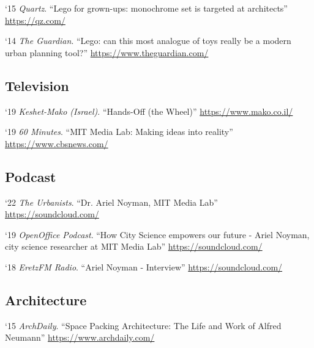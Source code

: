 \begin{tablist}
    \item[`15] \tab \textit{Quartz}. \enquote{Lego for grown-ups: monochrome set is targeted at architects}
    \href{https://qz.com/315776/lego-for-grown-ups-the-toy-maker-is-targeting-architects-and-urban-planners/}{https://qz.com/}

    \item[`14] \tab \textit{The Guardian}. \enquote{Lego: can this most analogue of toys really be a modern urban planning tool?}
    \href{https://www.theguardian.com/cities/2014/dec/18/lego-toys-urban-planning-tool-architects-mit}{https://www.theguardian.com/}

    \subsection*{Television}
    \item[`19] \tab \textit{Keshet-Mako (Israel)}. \enquote{Hands-Off (the Wheel)}
    \href{https://www.mako.co.il/nexter-weekend/Article-29c0ce116238d51006.htm}{https://www.mako.co.il/}

    \item[`19] \tab \textit{60 Minutes}. \enquote{MIT Media Lab: Making ideas into reality}
    \href{https://www.cbsnews.com/news/60-minutes-mit-media-lab-making-ideas-into-reality-future-factory-2019-08-04/}{https://www.cbsnews.com/}

    \subsection*{Podcast}

    \item[`22] \tab \textit{The Urbanists}. \enquote{Dr. Ariel Noyman, MIT Media Lab}
    \href{https://soundcloud.com/omer-raz/40a}{https://soundcloud.com/}
    
    \item[`19] \tab \textit{OpenOffice Podcast}. \enquote{How City Science empowers our future - Ariel Noyman, city science researcher at MIT Media Lab}
    \href{https://soundcloud.com/openofficepodcast/5-how-city-science-empowers-our-future-ariel-noyman-city-science-researcher-at-mit-media-lab}{https://soundcloud.com/}

    \item[`18] \tab \textit{EretzFM Radio}. \enquote{Ariel Noyman - Interview}
    \href{https://soundcloud.com/eretzfm/070119a-3}{https://soundcloud.com/}


    \subsection*{Architecture}
    \item[`15] \tab \textit{ArchDaily}. \enquote{Space Packing Architecture: The Life and Work of Alfred Neumann}
    \href{https://www.archdaily.com/633053/space-packing-architecture-the-life-and-work-of-alfred-neumann}{https://www.archdaily.com/}


\end{tablist}
